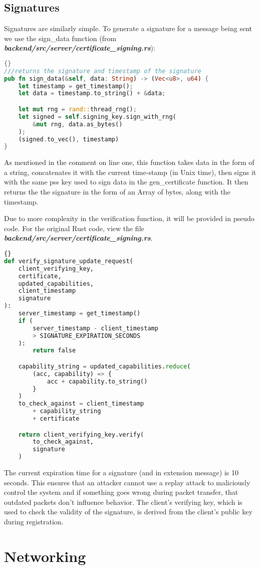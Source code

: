 \subsection{Signatures} \label{sec:chapimpl:security:signatures}
Signatures are similarly simple. To generate a signature for a message being sent we use the sign\_data function (from \textit{\textbf{backend/src/server/certificate\_signing.rs}}):
\begin{lstlisting}[language=Rust, style=boxed, showstringspaces=false]{}
///returns the signature and timestamp of the signature
pub fn sign_data(&self, data: String) -> (Vec<u8>, u64) {
    let timestamp = get_timestamp();
    let data = timestamp.to_string() + &data;

    let mut rng = rand::thread_rng();
    let signed = self.signing_key.sign_with_rng(
        &mut rng, data.as_bytes()
    );
    (signed.to_vec(), timestamp)
}
\end{lstlisting}
As mentioned in the comment on line one, this function takes data in the form of a string, concatenates it with the current time-stamp (in Unix time), then signs it with the same pss key used to sign data in the gen\_certificate function. It then returns the the signature in the form of an Array of bytes, along with the timestamp.

Due to more complexity in the verification function, it will be provided in pseudo code. For the original Rust code, view the file \textit{\textbf{backend/src/server/certificate\_signing.rs}}. 
\begin{lstlisting}[language=Python, style=boxed, showstringspaces=false]{}
def verify_signature_update_request(
    client_verifying_key,
    certificate,
    updated_capabilities,
    client_timestamp
    signature
):
    server_timestamp = get_timestamp()
    if (
        server_timestamp - client_timestamp 
        > SIGNATURE_EXPIRATION_SECONDS
    ):
        return false

    capability_string = updated_capabilities.reduce(
        (acc, capability) => {
            acc + capability.to_string()
        }
    )
    to_check_against = client_timestamp 
        + capability_string
        + certificate

    return client_verifying_key.verify(
        to_check_against,
        signature
    )
\end{lstlisting}
The current expiration time for a signature (and in extension message) is 10 seconds. This ensures that an attacker cannot use a replay attack to maliciously control the system and if something goes wrong during packet transfer, that outdated packets don't influence behavior. The client's verifying key, which is used to check the validity of the signature, is derived from the client's public key during registration.

\section{Networking} \label{sec:chapimpl:networking}

